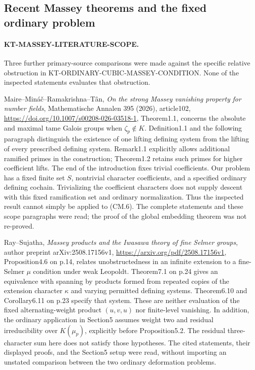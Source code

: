 \subsection{Recent Massey theorems and the fixed ordinary problem}

\paragraph{KT-MASSEY-LITERATURE-SCOPE.}
Three further primary-source comparisons were made against the
specific relative obstruction in
KT-ORDINARY-CUBIC-MASSEY-CONDITION. None of the inspected statements
evaluates that obstruction.

Maire--Min\'a\v{c}--Ramakrishna--T\^an,
\emph{On the strong Massey vanishing property for number fields},
Mathematische Annalen 395 (2026), article102,
\url{https://doi.org/10.1007/s00208-026-03518-1},
Theorem1.1, concerns the absolute and maximal tame Galois groups
when $\zeta_p\notin K$. Definition1.1 and the following paragraph
distinguish the existence of one lifting defining system from the
lifting of every prescribed defining system. Remark1.1 explicitly
allows additional ramified primes in the construction; Theorem1.2
retains such primes for higher coefficient lifts. The end of the
introduction fixes trivial coefficients. Our problem has a fixed
finite set $S$, nontrivial character coefficients, and a specified
ordinary defining cochain. Trivializing the coefficient characters
does not supply descent with this fixed ramification set and
ordinary normalization.
Thus the inspected result cannot simply be applied to (CM.6).
The complete statements and these scope paragraphs were read;
the proof of the global embedding theorem was not re-proved.

Ray--Sujatha, \emph{Massey products and the Iwasawa theory of fine
Selmer groups}, author preprint arXiv:2508.17156v1,
\url{https://arxiv.org/pdf/2508.17156v1}, Proposition4.6 on p.14,
relates unobstructedness in an infinite extension to a fine-Selmer
$\mu$ condition under weak Leopoldt. Theorem7.1 on p.24 gives an
equivalence with spanning by products formed from repeated copies
of the extension character $\kappa$ and varying permitted defining
systems. Theorem6.10 and Corollary6.11 on p.23 specify that system.
These are neither evaluation of the fixed alternating-weight
product $(u,v,u)$ nor finite-level vanishing. In addition, the
ordinary application in Section5 assumes weight two and residual
irreducibility over $K(\mu_p)$, explicitly before Proposition5.2.
The residual three-character sum here does not satisfy those
hypotheses. The cited statements, their displayed proofs, and the
Section5 setup were read, without importing an unstated comparison
between the two ordinary deformation problems.

